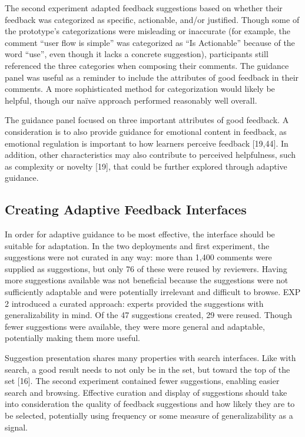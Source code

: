 The second experiment adapted feedback suggestions based on whether their feedback was categorized as specific, actionable, and/or justified. Though some of the prototype's categorizations were misleading or inaccurate (for example, the comment ``user flow is simple'' was categorized as ``Is Actionable'' because of the word ``use'', even though it lacks a concrete suggestion), participants still referenced the three categories when composing their comments. The guidance panel was useful as a reminder to include the attributes of good feedback in their comments. A more sophisticated method for categorization would likely be helpful, though our naïve approach performed reasonably well overall.

The guidance panel focused on three important attributes of good feedback. A consideration is to also provide guidance for emotional content in feedback, as emotional regulation is important to how learners perceive feedback [19,44]. In addition, other characteristics may also contribute to perceived helpfulness, such as complexity or novelty [19], that could be further explored through adaptive guidance.

\subsection{Creating Adaptive Feedback Interfaces}
In order for adaptive guidance to be most effective, the interface should be suitable for adaptation. In the two deployments and first experiment, the suggestions were not curated in any way: more than 1,400 comments were supplied as suggestions, but only 76 of these were reused by reviewers. Having more suggestions available was not beneficial because the suggestions were not sufficiently adaptable and were potentially irrelevant and difficult to browse. EXP 2 introduced a curated approach: experts provided the suggestions with generalizability in mind. Of the 47 suggestions created, 29 were reused. Though fewer suggestions were available, they were more general and adaptable, potentially making them more useful. 

Suggestion presentation shares many properties with search interfaces. Like with search, a good result needs to not only be in the set, but toward the top of the set [16]. The second experiment contained fewer suggestions, enabling easier search and browsing. Effective curation and display of suggestions should take into consideration the quality of feedback suggestions and how likely they are to be selected, potentially using frequency or some measure of generalizability as a signal. 
